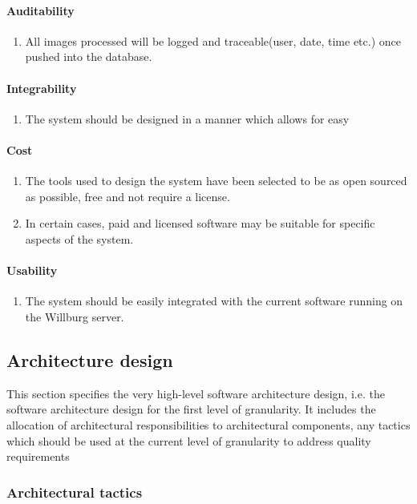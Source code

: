 \documentclass[a4paper,12pt]{report}
\begin{document}
\paragraph{Auditability}
\begin{enumerate}
	\item All images processed will be logged and traceable(user, date, time etc.) once pushed into the database.
\end{enumerate}
\paragraph{Integrability}
\begin{enumerate}
	\item The system should be designed in a manner which allows for easy 
\end{enumerate}
\paragraph{Cost}
\begin{enumerate}
	\item The tools used to design the system have been selected to be as open sourced as possible, free and not require a license.
	\item In certain cases, paid and licensed software may be suitable for specific aspects of the system. 
\end{enumerate}
\paragraph{Usability}
\begin{enumerate}
	\item The system should be easily integrated with the current software running on the Willburg server.
\end{enumerate}
\newpage

\subsection {Architecture design}
This section specifies the very high-level software architecture design, i.e. the software architecture
design for the first level of granularity. It includes the allocation of architectural responsibilities to
architectural components, any tactics which should be used at the current level of granularity to
address quality requirements

\subsubsection {Architectural tactics}
\end{document}
